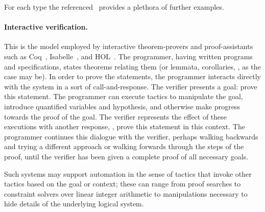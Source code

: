 For each type the referenced~\cite{Nelson_2019} provides a plethora of further
examples.

\paragraph{Interactive verification.} This is the model employed by interactive
theorem-provers and proof-assistants such as Coq~\cite{Coq},
Isabelle~\cite{Isabelle}, and HOL~\cite{HOL}. The programmer, having written
programs and specifications, states theorems relating them (or lemmata,
corollaries, \etc, as the case may be). In order to prove the statements, the
programmer interacts directly with the system in a sort of call-and-response.
The verifier presents a goal: prove this statement. The programmer can execute
tactics to manipulate the goal, introduce quantified variables and hypothesis,
and otherwise make progress towards the proof of the goal. The verifier
represents the effect of these executions with another response, \eg, prove this
statement in this context. The programmer continues this dialogue with the
verifier, perhaps walking backwards and trying a different approach or walking
forwards through the steps of the proof, until the verifier has been given a
complete proof of all necessary goals.

Such systems may support automation in the sense of tactics that invoke other
tactics based on the goal or context; these can range from proof searches to
constraint solvers over linear integer arithmetic to manipulations necessary to
hide details of the underlying logical system.

